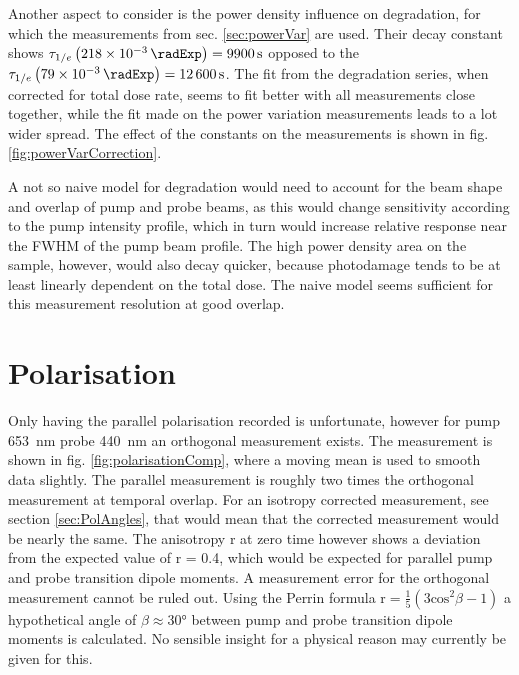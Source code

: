 \documentclass[twoside,openright,listof=numbered]{scrreprt}
\begin{document}
Another aspect to consider is the power density influence on degradation, for which the measurements from sec. \ref{sec:powerVar} are used.  Their decay constant shows $\tau_{1/e}\left(\SI{218e-3}{\radExp}\right)=\SI{9900}{\second}$  opposed to the $\tau_{1/e}\left(\SI{79e-3}{\radExp}\right)=\SI{12600}{\second}$. The fit from the degradation series, when corrected for total dose rate, seems to fit better with all measurements close together, while the fit made on the power variation measurements leads to a lot wider spread. The effect of the constants on the measurements is shown in fig. \ref{fig:powerVarCorrection}.

A not so naive model for degradation would need to account for the beam shape and overlap of pump and probe beams, as this would change sensitivity according to the pump intensity profile, which in turn would increase relative response near the FWHM of the pump beam profile. The high power density area on the sample, however, would also decay quicker, because photodamage tends to be at least linearly dependent on the total dose. The naive model seems sufficient for this measurement resolution at good overlap.

\section{Polarisation}
Only having the parallel polarisation recorded is unfortunate, however for pump \SI{653}{\nano\meter} probe \SI{440}{\nano\meter} an orthogonal measurement exists. The measurement is shown in fig. \ref{fig:polarisationComp}, where a moving mean is used to smooth data slightly. The parallel measurement is roughly two times the orthogonal measurement at temporal overlap. For an isotropy corrected measurement, see section \ref{sec:PolAngles}, that would mean that the corrected measurement would be nearly the same. The anisotropy r at zero time however shows a deviation from the expected value of r = 0.4, which would be expected for parallel pump and probe transition dipole moments. A measurement error for the orthogonal measurement cannot be ruled out. Using the Perrin formula $\mathrm{r} = \frac{1}{5}(3\mathrm{cos}^2\beta-1)$ a hypothetical angle of $\beta \approx \ang{30}$ between pump and probe transition dipole moments is calculated. No sensible insight for a physical reason may currently be given for this. 
\end{document}
